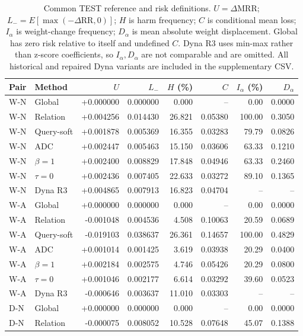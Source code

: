 \begin{table}[htbp]
\centering\footnotesize
\setlength{\tabcolsep}{3.5pt}
\caption{Common TEST reference and risk definitions. $U=\Delta\mathrm{MRR}$; $L_-=E[\max(-\Delta\mathrm{RR},0)]$; $H$ is harm frequency; $C$ is conditional mean loss; $I_\alpha$ is weight-change frequency; $D_\alpha$ is mean absolute weight displacement. Global has zero risk relative to itself and undefined $C$. Dyna R3 uses min-max rather than z-score coefficients, so $I_\alpha,D_\alpha$ are not comparable and are omitted. All historical and repaired Dyna variants are included in the supplementary CSV.}
\label{tab:conservative-fair}
\begin{tabular}{llrrrrrr}
\toprule
Pair & Method & $U$ & $L_-$ & $H$ (\%) & $C$ & $I_\alpha$ (\%) & $D_\alpha$\\
\midrule
W-N & Global & +0.000000 & 0.000000 & 0.000 & -- & 0.00 & 0.0000\\
W-N & Relation & +0.004256 & 0.014430 & 26.821 & 0.05380 & 100.00 & 0.3050\\
W-N & Query-soft & +0.001878 & 0.005369 & 16.355 & 0.03283 & 79.79 & 0.0826\\
W-N & ADC & +0.002447 & 0.005463 & 15.150 & 0.03606 & 63.33 & 0.1210\\
W-N & $\beta=1$ & +0.002400 & 0.008829 & 17.848 & 0.04946 & 63.33 & 0.2460\\
W-N & $\tau=0$ & +0.002436 & 0.007405 & 22.633 & 0.03272 & 89.10 & 0.1365\\
W-N & Dyna R3 & +0.004865 & 0.007913 & 16.823 & 0.04704 & -- & --\\
\midrule
W-A & Global & +0.000000 & 0.000000 & 0.000 & -- & 0.00 & 0.0000\\
W-A & Relation & -0.001048 & 0.004536 & 4.508 & 0.10063 & 20.59 & 0.0689\\
W-A & Query-soft & -0.019103 & 0.038637 & 26.361 & 0.14657 & 100.00 & 0.4829\\
W-A & ADC & +0.001014 & 0.001425 & 3.619 & 0.03938 & 20.29 & 0.0400\\
W-A & $\beta=1$ & +0.002184 & 0.002575 & 4.746 & 0.05426 & 20.29 & 0.0800\\
W-A & $\tau=0$ & +0.001046 & 0.002177 & 6.614 & 0.03292 & 39.60 & 0.0523\\
W-A & Dyna R3 & -0.000646 & 0.003637 & 11.010 & 0.03303 & -- & --\\
\midrule
D-N & Global & +0.000000 & 0.000000 & 0.000 & -- & 0.00 & 0.0000\\
D-N & Relation & -0.000075 & 0.008052 & 10.528 & 0.07648 & 45.07 & 0.1388\\

\end{tabular}
\end{table}
